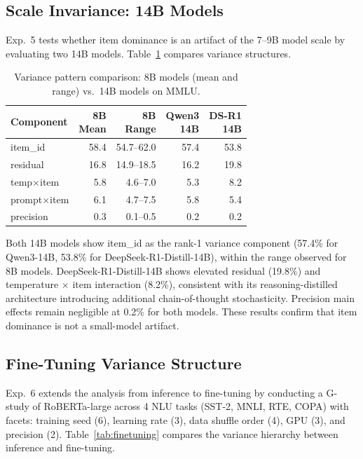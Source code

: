 \documentclass[letterpaper,11pt]{article}
\begin{document}
\subsection{Scale Invariance: 14B Models}

Exp.~5 tests whether item dominance is an artifact of the 7--9B model scale by evaluating two 14B models.
Table~\ref{tab:14b_comparison} compares variance structures.

\begin{table}[t]
\centering
\caption{Variance pattern comparison: 8B models (mean and range) vs.\ 14B models on MMLU.}
\label{tab:14b_comparison}
\small
\begin{tabular}{lrrrr}
\toprule
Component & \makecell{8B \\ Mean} & \makecell{8B \\ Range} & \makecell{Qwen3 \\ 14B} & \makecell{DS-R1 \\ 14B} \\
\midrule
item\_id & 58.4 & 54.7--62.0 & 57.4 & 53.8 \\
residual & 16.8 & 14.9--18.5 & 16.2 & 19.8 \\
temp$\times$item & 5.8 & 4.6--7.0 & 5.3 & 8.2 \\
prompt$\times$item & 6.1 & 4.7--7.5 & 5.8 & 5.4 \\
precision & 0.3 & 0.1--0.5 & 0.2 & 0.2 \\
\bottomrule
\end{tabular}
\end{table}

Both 14B models show item\_id as the rank-1 variance component (57.4\% for Qwen3-14B, 53.8\% for DeepSeek-R1-Distill-14B), within the range observed for 8B models.
DeepSeek-R1-Distill-14B shows elevated residual (19.8\%) and temperature $\times$ item interaction (8.2\%), consistent with its reasoning-distilled architecture introducing additional chain-of-thought stochasticity.
Precision main effects remain negligible at 0.2\% for both models.
These results confirm that item dominance is not a small-model artifact.

\subsection{Fine-Tuning Variance Structure}

Exp.~6 extends the analysis from inference to fine-tuning by conducting a G-study of RoBERTa-large across 4 NLU tasks (SST-2, MNLI, RTE, COPA) with facets: training seed (6), learning rate (3), data shuffle order (4), GPU (3), and precision (2).
Table~\ref{tab:finetuning} compares the variance hierarchy between inference and fine-tuning.
\end{document}
